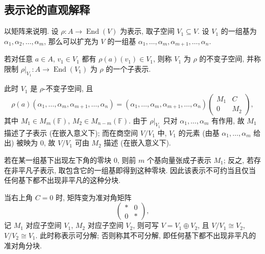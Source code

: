 \subsection{表示论的直观解释}

以矩阵来说明. 设 $\rho\colon A\to\operatorname{End}(V)$ 为表示, 取子空间 $V_1\subseteq V$.
设 $V_1$ 的一组基为 $\alpha_1,\alpha_2,\dots,\alpha_m$, 那么可以扩充为 $V$ 的一组基
$\alpha_1,\dots,\alpha_m,\alpha_{m+1},\dots,\alpha_n$.

\begin{definition}[子表示]\label{def:subrepresentation}
若对任意 $a\in A$, $v_1\in V_1$ 都有 $\rho(a)(v_1)\in V_1$, 则称 $V_1$ 为 $\rho$ 的不变子空间,
并称限制 $\rho|_{V_1}\colon A\to\operatorname{End}(V_1)$ 为 $\rho$ 的一个子表示.
\end{definition}

此时 $V_1$ 是 $\rho$-不变子空间, 且
\[
  \rho(a)(\alpha_1,\dots,\alpha_m,\alpha_{m+1},\dots,\alpha_n)
  =(\alpha_1,\dots,\alpha_m,\alpha_{m+1},\dots,\alpha_n)
  \begin{pmatrix}
    M_1 & C\\
    0 & M_2
  \end{pmatrix},
\]
其中 $M_1\in M_m(\mathbb{F})$, $M_2\in M_{n-m}(\mathbb{F})$. 由于 $\rho|_{V_1}$ 只对 $\alpha_1,\dots,\alpha_m$ 有作用,
故 $M_1$ 描述了子表示 (在嵌入意义下); 而在商空间 $V/V_1$ 中, $V_1$ 的元素 (由基
$\alpha_1,\dots,\alpha_m$ 给出) 被映为 $0$, 故 $V/V_1$ 可由 $M_2$ 描述 (在嵌入意义下).

若在某一组基下出现左下角的零块 $0$, 则前 $m$ 个基向量张成子表示 $M_1$;
反之, 若存在非平凡子表示, 取包含它的一组基即得到这种零块.
因此该表示不可约当且仅当任何基下都不出现非平凡的这种分块.

当右上角 $C=0$ 时, 矩阵变为准对角矩阵
\[
  \begin{pmatrix}
    * & 0\\
    0 & *
  \end{pmatrix},
\]
记 $M_1$ 对应子空间 $V_1$, $M_2$ 对应子空间 $V_2$, 则可写 $V=V_1\oplus V_2$,
且 $V/V_1\cong V_2$, $V/V_2\cong V_1$. 此时称表示可分解; 否则称其不可分解,
即任何基下都不出现非平凡的准对角分块.

